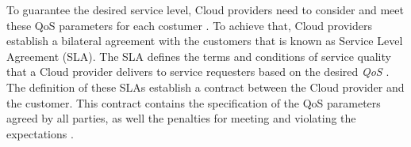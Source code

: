 To guarantee the desired service level, Cloud providers need to consider and meet
these QoS parameters for each costumer \cite{vaquero2008break}. To achieve that, Cloud
providers establish a bilateral agreement with the customers that is known as Service Level
Agreement (SLA). The SLA defines the terms and conditions of service quality that a
Cloud provider delivers to service requesters based on the desired \textit{QoS} \cite{zeng2004qos}.\\

The definition of these SLAs establish a contract between the Cloud provider and the customer.
This contract contains the specification of the QoS parameters agreed by all parties, as
well the penalties for meeting and violating the expectations \cite{vaquero2008break}.
